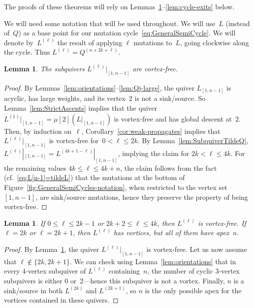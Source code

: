 \documentclass[11pt, letterpaper]{amsart}
\newtheorem{lemma}[theorem]{Lemma}
\theoremstyle{definition}
\numberwithin{equation}{section}
\newcommand{\T}[2]{\mu[#1](#2)} %
\begin{document}
The proofs of these theorems will rely on Lemmas~\ref{lem:QTildeGlobalDescentVF}--\ref{lem:cycle-exits} below.

We will need some notation that will be used throughout. 
We will use~$L$ (instead of~$Q$) as a base point for our mutation cycle~\eqref{eq:GeneralSemiCycle}. 
We will denote by~$L^{(\ell)}$ the result of applying $\ell$ mutations to~$L$, going clockwise along the cycle. 
Thus $L^{(\ell)}=Q^{(n+2k+\ell)}$. 

\begin{lemma}
\label{lem:QTildeGlobalDescentVF}
The subquivers $L^{(\ell)}|_{[1,n-1]}$ are vortex-free. 
\end{lemma}

\begin{proof}
By Lemmas~\ref{lem:orientations}--\ref{lem:Qj-large}, the quiver $L_{[1,n-1]}$ is acyclic, has large weights, 
and its vertex~$2$ is not a sink/source.
So Lemma~\ref{lem:StrictAscents} implies that 
the quiver $L^{(1)}|_{[1,n-1]} = \T{2}{L|_{[1,n-1]}}$ is vortex-free and has global descent at~$2$. 
Then, by induction on~$\ell$, Corollary~\ref{cor:weak-propagates} implies that $L^{(\ell)}|_{[1,n-1]}$ is vortex-free 
for~$0 < \ell \leq 2k$. 
By Lemma~\ref{lem:SubquiverTildeQ}, ${L^{(\ell)}|_{[1,n-1]}=L^{(4k+1 - \ell)}|_{[1,n-1]}}$,
implying the claim for $2k<\ell\le 4k$.
For the remaining values $4k\le \ell\le 4k+n$, the claim follows from the fact 
(cf.~\eqref{eq:L[n-1]=tildeL}) 
that the mutations at the bottom of Figure~\ref{fig:GeneralSemiCycles-notation},
when restricted to the vertex set $[1,n-1]$, are sink/source mutations,
hence they preserve the property of being vortex-free. 
\end{proof}

\begin{lemma}
\label{lem:VortexFreeEll}
If $0\le \ell \le 2k-1$ or $2k+2\le \ell \leq 4k$, then $L^{(\ell)}$ is vortex-free. 
If $\ell = 2k$ or $\ell=2k+1$, then $L^{(\ell)}$ has vortices, but all of them have apex~$n$. 
\end{lemma}
\begin{proof}
By Lemma~\ref{lem:QTildeGlobalDescentVF}, the quiver $L^{(\ell)}|_{[1,n-1]}$ is vortex-free. 
Let us now assume that $\ell \notin \{2k, 2k+1\}$.
We can check using Lemma~\ref{lem:orientations} 
that in every 4-vertex subquiver of $L^{(\ell)}$ containing~$n$, 
the number of cyclic 3-vertex subquivers is either 0 or~2---hence this subquiver is not a vortex. 
Finally, $n$ is a sink/source in both $L^{(2k)}$ and $L^{(2k+1)}$, so $n$ is the only possible apex
for the vortices contained in these quivers. 
\end{proof}
\end{document}
